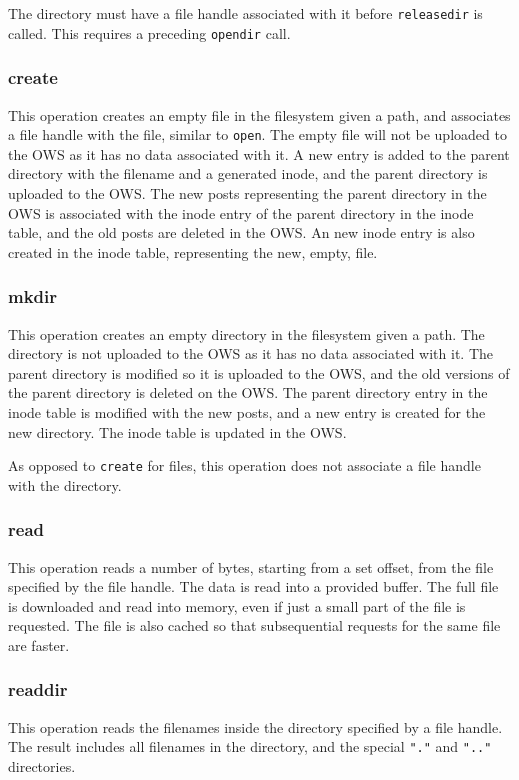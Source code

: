 The directory must have a file handle associated with it before \texttt{releasedir} is called. This requires a preceding \texttt{opendir} call.

\subsubsection{create}
This operation creates an empty file in the filesystem given a path, and associates a file handle with the file, similar to \texttt{open}. The empty file will not be uploaded to the OWS as it has no data associated with it. A new entry is added to the parent directory with the filename and a generated inode, and the parent directory is uploaded to the OWS. The new posts representing the parent directory in the OWS is associated with the inode entry of the parent directory in the inode table, and the old posts are deleted in the OWS. An new inode entry is also created in the inode table, representing the new, empty, file.

\subsubsection{mkdir}
This operation creates an empty directory in the filesystem given a path. The directory is not uploaded to the OWS as it has no data associated with it. The parent directory is modified so it is uploaded to the OWS, and the old versions of the parent directory is deleted on the OWS. The parent directory entry in the inode table is modified with the new posts, and a new entry is created for the new directory. The inode table is updated in the OWS.

As opposed to \texttt{create} for files, this operation does not associate a file handle with the directory.

\subsubsection{read}
This operation reads a number of bytes, starting from a set offset, from the file specified by the file handle. The data is read into a provided buffer. The full file is downloaded and read into memory, even if just a small part of the file is requested. The file is also cached so that subsequential requests for the same file are faster. 

\subsubsection{readdir}
This operation reads the filenames inside the directory specified by a file handle. The result includes all filenames in the directory, and the special \texttt{"."} and \texttt{".."} directories.

